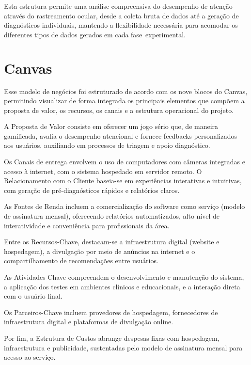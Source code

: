 \documentclass[
  a4paper,%
  12pt,%
  english,%
  brazilian,%
]{article}
\begin{document}
 Esta estrutura permite uma análise compreensiva do desempenho de atenção através do rastreamento ocular, desde a coleta bruta de dados até a geração de diagnósticos individuais, mantendo a flexibilidade necessária para acomodar os diferentes tipos de dados gerados em cada fase experimental.

\section*{Canvas}
    
    Esse modelo de negócios foi estruturado de acordo com os nove blocos do Canvas, permitindo visualizar de forma integrada os principais elementos que compõem a proposta de valor, os recursos, os canais e a estrutura operacional do projeto.

    A Proposta de Valor consiste em oferecer um jogo sério que, de maneira gamificada, avalia o desempenho atencional e fornece feedbacks personalizados aos usuários, auxiliando em processos de triagem e apoio diagnóstico.

    Os Canais de entrega envolvem o uso de computadores com câmeras integradas e acesso à internet, com o sistema hospedado em servidor remoto. O Relacionamento com o Cliente baseia-se em experiências interativas e intuitivas, com geração de pré-diagnósticos rápidos e relatórios claros.

    As Fontes de Renda incluem a comercialização do software como serviço (modelo de assinatura mensal), oferecendo relatórios automatizados, alto nível de interatividade e conveniência para profissionais da área.

    Entre os Recursos-Chave, destacam-se a infraestrutura digital (website e hospedagem), a divulgação por meio de anúncios na internet e o compartilhamento de recomendações entre usuários.

    As Atividades-Chave compreendem o desenvolvimento e manutenção do sistema, a aplicação dos testes em ambientes clínicos e educacionais, e a interação direta com o usuário final.

    Os Parceiros-Chave incluem provedores de hospedagem, fornecedores de infraestrutura digital e plataformas de divulgação online.

    Por fim, a Estrutura de Custos abrange despesas fixas com hospedagem, infraestrutura e publicidade, sustentadas pelo modelo de assinatura mensal para acesso ao serviço.
\end{document}
